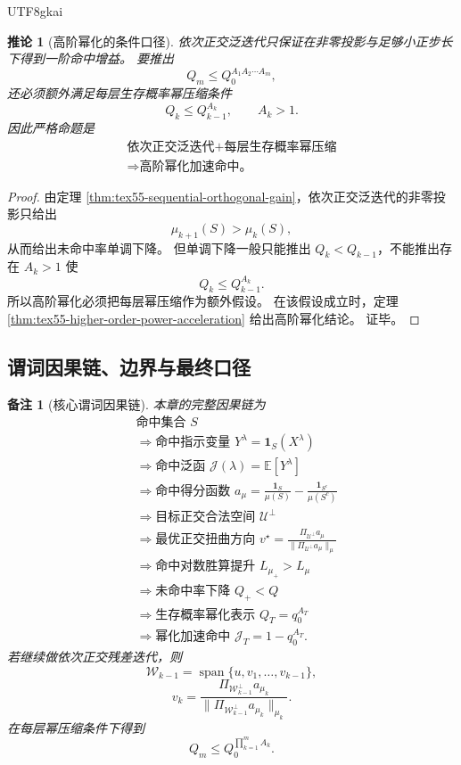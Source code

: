 \documentclass[12pt]{article}
\newtheorem{corollary}{推论}[section]
\newtheorem{remark}{备注}[section]
\begin{document}
\begin{CJK*}{UTF8}{gkai}
\begin{corollary}[高阶幂化的条件口径]
\label{cor:tex55-higher-order-power-boundary}
依次正交泛迭代只保证在非零投影与足够小正步长下得到一阶命中增益。
要推出
\[
  Q_m
  \le
  Q_0^{A_1A_2\cdots A_m},
\]
还必须额外满足每层生存概率幂压缩条件
\[
  Q_k\le Q_{k-1}^{A_k},
  \qquad
  A_k>1.
\]
因此严格命题是
\[
  \boxed{
  \begin{gathered}
  \text{依次正交泛迭代}
  +
  \text{每层生存概率幂压缩}\\
  \Longrightarrow
  \text{高阶幂化加速命中。}
  \end{gathered}
  }
\]
\end{corollary}

\begin{proof}
由定理 \ref{thm:tex55-sequential-orthogonal-gain}，依次正交泛迭代的非零投影只给出
\[
  \mu_{k+1}(S)>\mu_k(S),
\]
从而给出未命中率单调下降。
但单调下降一般只能推出 \(Q_k<Q_{k-1}\)，不能推出存在 \(A_k>1\) 使
\[
  Q_k\le Q_{k-1}^{A_k}.
\]
所以高阶幂化必须把每层幂压缩作为额外假设。
在该假设成立时，定理 \ref{thm:tex55-higher-order-power-acceleration} 给出高阶幂化结论。
证毕。
\end{proof}

\subsection{谓词因果链、边界与最终口径}
\label{subsec:tex55-orthogonal-chain-boundary}

\begin{remark}[核心谓词因果链]
本章的完整因果链为
\[
\begin{aligned}
  &\text{命中集合 }S\\
  &\Longrightarrow
  \text{命中指示变量 }Y^\lambda=\mathbf 1_S(X^\lambda)\\
  &\Longrightarrow
  \text{命中泛函 }\mathcal J(\lambda)=\mathbb E[Y^\lambda]\\
  &\Longrightarrow
  \text{命中得分函数 }
  a_\mu=
  \frac{\mathbf 1_S}{\mu(S)}
  -
  \frac{\mathbf 1_{S^c}}{\mu(S^c)}\\
  &\Longrightarrow
  \text{目标正交合法空间 }\mathcal U^\perp\\
  &\Longrightarrow
  \text{最优正交扭曲方向 }
  v^\star=
  \frac{\Pi_{\mathcal U^\perp}a_\mu}
  {\lVert\Pi_{\mathcal U^\perp}a_\mu\rVert_\mu}\\
  &\Longrightarrow
  \text{命中对数胜算提升 }L_{\mu_+}>L_\mu\\
  &\Longrightarrow
  \text{未命中率下降 }Q_+<Q\\
  &\Longrightarrow
  \text{生存概率幂化表示 }Q_T=q_0^{A_T}\\
  &\Longrightarrow
  \text{幂化加速命中 }\mathcal J_T=1-q_0^{A_T}.
\end{aligned}
\]
若继续做依次正交残差迭代，则
\[
  \mathcal W_{k-1}
  =
  \operatorname{span}\{u,v_1,\ldots,v_{k-1}\},
\]
\[
  v_k
  =
  \frac{\Pi_{\mathcal W_{k-1}^\perp}a_{\mu_k}}
  {\lVert\Pi_{\mathcal W_{k-1}^\perp}a_{\mu_k}\rVert_{\mu_k}}.
\]
在每层幂压缩条件下得到
\[
  Q_m
  \le
  Q_0^{\prod_{k=1}^{m}A_k}.
\]
\end{remark}


\end{CJK*}
\end{document}
